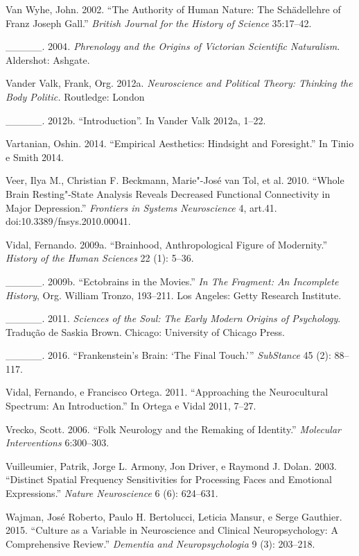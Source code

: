 {\begin{Parskip}
Van Wyhe, John. 2002. ``The Authority of Human Nature: The Schädellehre
of Franz Joseph Gall.'' \emph{British Journal for the History of
Science} 35:17--42.

\_\_\_\_\_. 2004\emph{. Phrenology and the Origins of Victorian
Scientific Naturalism.} Aldershot: Ashgate.

Vander Valk, Frank, Org. 2012a. \emph{Neuroscience and Political Theory:
Thinking the Body Politic.} Routledge: London

\_\_\_\_\_. 2012b. ``Introduction''. In Vander Valk 2012a, 1--22.

Vartanian, Oshin. 2014. ``Empirical Aesthetics: Hindsight and
Foresight.'' In Tinio e Smith 2014.

Veer, Ilya M., Christian F. Beckmann, Marie"-José van Tol, et al. 2010.
``Whole Brain Resting"-State Analysis Reveals Decreased Functional
Connectivity in Major Depression.'' \emph{Frontiers in Systems
Neuroscience} 4, art.41. doi:10.3389/fnsys.2010.00041.

Vidal, Fernando. 2009a. ``Brainhood, Anthropological Figure of
Modernity.'' \emph{History of the Human Sciences} 22 (1): 5--36.

\_\_\_\_\_. 2009b. ``Ectobrains in the Movies.'' \emph{In The Fragment:
An Incomplete History}, Org. William Tronzo, 193--211. Los Angeles:
Getty Research Institute.

\_\_\_\_\_. 2011. \emph{Sciences of the Soul: The Early Modern Origins of
Psychology}. Tradução de Saskia Brown. Chicago: University of Chicago
Press.

\_\_\_\_\_. 2016. ``Frankenstein's Brain: `The Final Touch.'''
\emph{SubStance} 45 (2): 88--117.

Vidal, Fernando, e Francisco Ortega. 2011. ``Approaching the
Neurocultural Spectrum: An Introduction.'' In Ortega e Vidal 2011,
7--27.

Vrecko, Scott. 2006. ``Folk Neurology and the Remaking of Identity.''
\emph{Molecular Interventions} 6:300--303.

Vuilleumier, Patrik, Jorge L. Armony, Jon Driver, e Raymond J. Dolan.
2003. ``Distinct Spatial Frequency Sensitivities for Processing Faces
and Emotional Expressions.'' \emph{Nature Neuroscience} 6 (6): 624--631.

Wajman, José Roberto, Paulo H. Bertolucci, Leticia Mansur, e Serge
Gauthier. 2015. ``Culture as a Variable in Neuroscience and Clinical
Neuropsychology: A Comprehensive Review.'' \emph{Dementia and
Neuropsychologia} 9 (3): 203--218.


\end{Parskip}}
